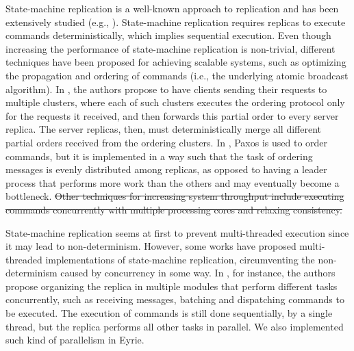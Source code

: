 \documentclass[10pt, conference, compsocconf, letterpaper]{IEEEtranv17}
\providecommand{\DIFdel}[1]{{\protect\color{red}\sout{#1}}}                      %
\providecommand{\DIFdelbegin}{} %
\providecommand{\DIFdelend}{} %
\begin{document}
State-machine replication is a well-known approach to replication and has been extensively studied (e.g., \cite{Lam78, Sch90, santos2011htsmr, kotla2004htbft, kapritzos2012eve}). 
State-machine replication requires replicas to execute commands deterministically, which implies sequential execution. 
Even though increasing the performance of state-machine replication is non-trivial, different techniques have been proposed for achieving scalable systems, such as optimizing the propagation and ordering of commands (i.e., the underlying atomic broadcast algorithm). 
In \cite{kapritsos2010scalable}, the authors propose to have clients sending their requests to multiple clusters, where each of such clusters executes the ordering protocol only for the requests it received, and then forwards this partial order to every server replica. The server replicas, then, must deterministically merge all different partial orders received from the ordering clusters.
In \cite{biely2012spaxos}, Paxos \cite{Lam98} is used to order commands, but it is implemented in a way such that the task of ordering messages is evenly distributed among replicas, as opposed to having a leader process that performs more work than the others and may eventually become a bottleneck. 
\DIFdelbegin \DIFdel{Other techniques for increasing system throughput include executing commands concurrently with multiple processing cores and relaxing consistency.
}\DIFdelend %

State-machine replication seems at first to prevent multi-threaded execution since it may lead to non-determinism. 
However, some works have proposed multi-threaded implementations of state-machine replication, circumventing the non-determinism caused by concurrency in some way. 
In \cite{santos2011htsmr}, for instance, the authors propose organizing the replica in multiple modules that perform different tasks concurrently, such as receiving messages, batching and dispatching commands to be executed. 
The execution of commands is still done sequentially, by a single thread, but the replica performs all other tasks in parallel. We also implemented such kind of parallelism in Eyrie.
\end{document}
